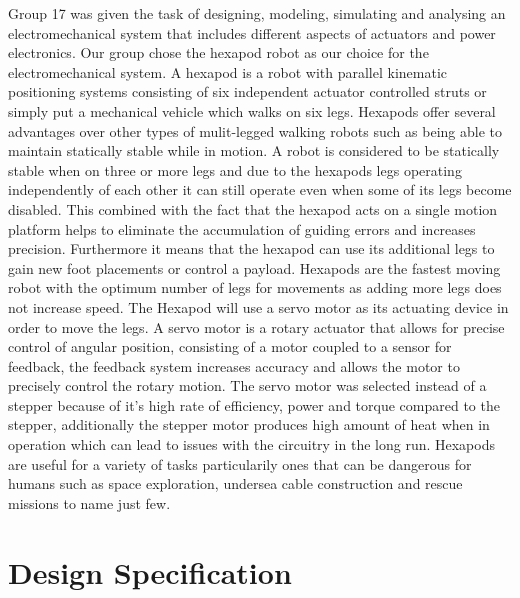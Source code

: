 Group 17 was given the task of designing, modeling, simulating and analysing an electromechanical system that includes different aspects of actuators and power electronics. Our group chose the hexapod robot as our choice for the electromechanical system. A hexapod is a robot with parallel kinematic positioning systems consisting of six independent actuator controlled struts or simply put a mechanical vehicle which walks on six legs. Hexapods offer several advantages over other types of mulit-legged  walking robots such as being able to maintain statically stable while in motion. A robot is considered to be statically stable when on three or more legs and due to the hexapods legs operating independently of each other it can still operate even when some of its legs become disabled. This combined with the fact that the hexapod acts on a single motion platform helps to eliminate the accumulation of guiding errors and increases precision. Furthermore it means that  the hexapod can use its additional legs to gain new foot placements or control a payload. Hexapods are the fastest moving robot with the optimum number of legs for movements as adding more legs does not increase speed. The Hexapod will use a servo motor as its actuating device in order to move the legs. A servo motor is a rotary actuator that allows for precise control of angular position, consisting of a motor coupled to a sensor for feedback, the feedback system increases accuracy and allows the motor to precisely control the rotary motion. The servo motor was selected instead of a stepper because of it's high rate of efficiency, power and torque compared to the stepper, additionally the stepper motor produces  high amount of heat when in operation which can lead to issues with the circuitry in the long run. Hexapods are useful for a variety of tasks particularily ones that can be dangerous for humans such as space exploration, undersea cable construction and rescue missions to name just few. 









\section{Design Specification}




